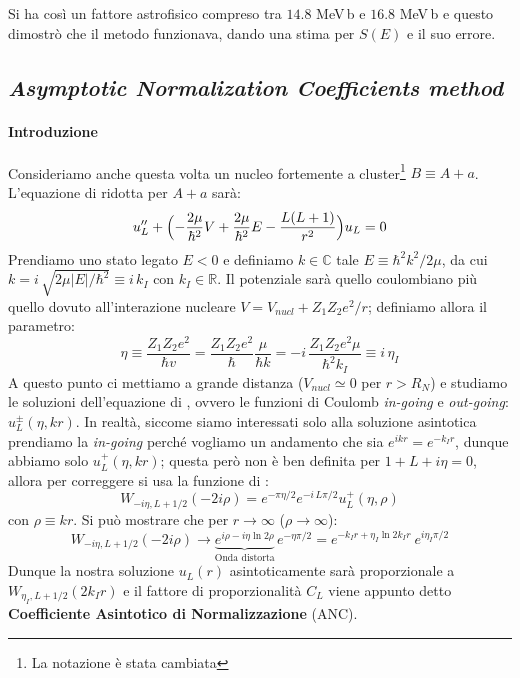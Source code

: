\noindent Si ha così un fattore astrofisico compreso tra $14.8$ MeV$\,$b e $16.8$ MeV$\,$b e questo dimostrò che il metodo funzionava, dando una stima per $S(E)$ e il suo errore.
\newpage
\subsection{\textit{Asymptotic Normalization Coefficients method}}
\paragraph{Introduzione}
Consideriamo anche questa volta un nucleo fortemente a cluster\footnote{La notazione è stata cambiata} $B\equiv A+a$. L'equazione di \Sch{} ridotta per $A+a$ sarà:
$$u_L'' + \Bigl ( -\frac{2\mu }{\hbar^2} V+ \frac{2\mu }{\hbar^2}E - \frac{L(L+1)}{r^2} \Bigr )u_L =0$$
Prendiamo uno stato legato $E<0$ e definiamo $k\in \mathbb{C}$ tale $E\equiv \hbar^2 k^2 / 2\mu$, da cui $k = i\, \sqrt{2\mu |E|/\hbar^2} \equiv i\,k_I$ con $k_I\in \mathbb{R}$. Il potenziale sarà quello coulombiano più quello dovuto all'interazione nucleare $V=V_{nucl} + Z_1Z_2 e^2 /r$; definiamo allora il parametro:
$$\eta \equiv \frac{Z_1Z_2 e^2}{\hbar v} = \frac{Z_1Z_2 e^2}{\hbar}\frac{\mu}{\hbar k} = - i \, \frac{Z_1Z_2 e^2\mu}{\hbar^2 k_I} \equiv i\, \eta_I$$
A questo punto ci mettiamo a grande distanza ($V_{nucl} \simeq 0$ per $r>R_N$) e studiamo le soluzioni dell'equazione di \Sch{}, ovvero le funzioni di Coulomb \textit{in-going} e \textit{out-going}: $u^\pm_L (\eta,kr)$. In realtà, siccome siamo interessati solo alla soluzione asintotica prendiamo la \textit{in-going} perché vogliamo un andamento che sia $e^{ikr}=e^{-k_I r}$, dunque abbiamo solo $u^+_L(\eta,kr)$; questa però non è ben definita per $1+L+i\eta =0$, allora per correggere si usa la funzione di \Wh{}:
$$W_{-i\eta,L+1/2}(-2i\rho) = e^{-\pi\eta/2}e^{-i\,L\pi/2} u^+_L(\eta,\rho)$$
con $\rho\equiv kr$. Si può mostrare che per $r\to\infty$ ($\rho\to\infty$):
$$W_{-i\eta,L+1/2}(-2i\rho) \to \underbrace{e^{i\rho-i\eta\ln{2\rho}}}_\text{Onda distorta} \, e^{-\eta\pi/2} = e^{-k_Ir + \eta_I \ln{2k_Ir}}\: e^{i\eta_I\pi/2}$$
Dunque la nostra soluzione $u_L(r)$ asintoticamente sarà proporzionale a $W_{\eta_I,L+1/2}(2k_I r)$ e il fattore di proporzionalità $C_L$ viene appunto detto \textbf{Coefficiente Asintotico di Normalizzazione} (ANC).

